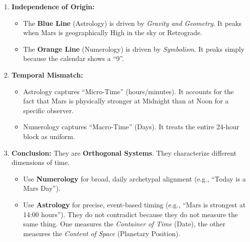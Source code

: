 \documentclass[
  american,
  11pt,
  oneside,
  openany]{scrbook}
\providecommand{\tightlist}{%
  \setlength{\itemsep}{0pt}\setlength{\parskip}{0pt}}
\begin{document}
\begin{enumerate}
\def\labelenumi{\arabic{enumi}.}
\tightlist
\item
  \textbf{Independence of Origin:}

  \begin{itemize}
  \tightlist
  \item
    The \textbf{Blue Line} (Astrology) is driven by \emph{Gravity and
    Geometry}. It peaks when Mars is geographically High in the sky or
    Retrograde.
  \item
    The \textbf{Orange Line} (Numerology) is driven by \emph{Symbolism}.
    It peaks simply because the calendar shows a ``9''.
  \end{itemize}
\item
  \textbf{Temporal Mismatch:}

  \begin{itemize}
  \tightlist
  \item
    Astrology captures ``Micro-Time'' (hours/minutes). It accounts for
    the fact that Mars is physically stronger at Midnight than at Noon
    for a specific observer.
  \item
    Numerology captures ``Macro-Time'' (Days). It treats the entire
    24-hour block as uniform.
  \end{itemize}
\item
  \textbf{Conclusion:} They are \textbf{Orthogonal Systems}. They
  characterize different dimensions of time.

  \begin{itemize}
  \tightlist
  \item
    Use \textbf{Numerology} for broad, daily archetypal alignment (e.g.,
    ``Today is a Mars Day'').
  \item
    Use \textbf{Astrology} for precise, event-based timing (e.g., ``Mars
    is strongest at 14:00 hours''). They do not contradict because they
    do not measure the same thing. One measures the \emph{Container of
    Time} (Date), the other measures the \emph{Content of Space}
    (Planetary Position).
  \end{itemize}
\end{enumerate}


\backmatter
\end{document}
